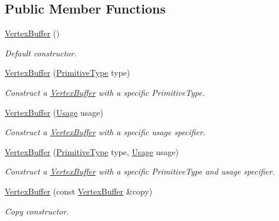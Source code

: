 \subsection*{Public Member Functions}
\begin{DoxyCompactItemize}
\item 
\mbox{\hyperlink{classsf_1_1_vertex_buffer_aba8836c571cef25a0f80e478add1560a}{Vertex\+Buffer}} ()
\begin{DoxyCompactList}\small\item\em Default constructor. \end{DoxyCompactList}\item 
\mbox{\hyperlink{classsf_1_1_vertex_buffer_a3f51dcd61dac52be54ba7b22ebdea7c8}{Vertex\+Buffer}} (\mbox{\hyperlink{group__graphics_ga5ee56ac1339984909610713096283b1b}{Primitive\+Type}} type)
\begin{DoxyCompactList}\small\item\em Construct a \mbox{\hyperlink{classsf_1_1_vertex_buffer}{Vertex\+Buffer}} with a specific Primitive\+Type. \end{DoxyCompactList}\item 
\mbox{\hyperlink{classsf_1_1_vertex_buffer_af2dce0a43e061e5f91b97cf7267427e3}{Vertex\+Buffer}} (\mbox{\hyperlink{classsf_1_1_vertex_buffer_a3a531528684e63ecb45edd51282f5cb7}{Usage}} usage)
\begin{DoxyCompactList}\small\item\em Construct a \mbox{\hyperlink{classsf_1_1_vertex_buffer}{Vertex\+Buffer}} with a specific usage specifier. \end{DoxyCompactList}\item 
\mbox{\hyperlink{classsf_1_1_vertex_buffer_a326a5c89f1ba01b51b323535494434e8}{Vertex\+Buffer}} (\mbox{\hyperlink{group__graphics_ga5ee56ac1339984909610713096283b1b}{Primitive\+Type}} type, \mbox{\hyperlink{classsf_1_1_vertex_buffer_a3a531528684e63ecb45edd51282f5cb7}{Usage}} usage)
\begin{DoxyCompactList}\small\item\em Construct a \mbox{\hyperlink{classsf_1_1_vertex_buffer}{Vertex\+Buffer}} with a specific Primitive\+Type and usage specifier. \end{DoxyCompactList}\item 
\mbox{\hyperlink{classsf_1_1_vertex_buffer_a2f2ff1e218cfc749b87f8873e23c016b}{Vertex\+Buffer}} (const \mbox{\hyperlink{classsf_1_1_vertex_buffer}{Vertex\+Buffer}} \&copy)
\begin{DoxyCompactList}\small\item\em Copy constructor. \end{DoxyCompactList}\item 

\end{DoxyCompactItemize}
